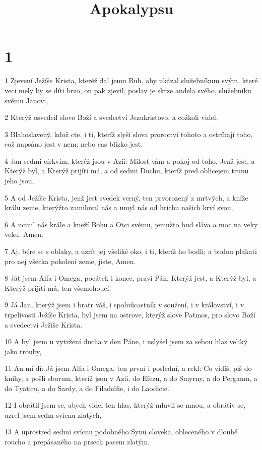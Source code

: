 

\title{Apokalypsu}

\chapter{1}

\par 1 Zjevení Ježíše Krista, kteréž dal jemu Buh, aby ukázal služebníkum svým, které veci mely by se díti brzo, on pak zjevil, poslav je skrze andela svého, služebníku svému Janovi,
\par 2 Kterýž osvedcil slovo Boží a svedectví Jezukristovo, a cožkoli videl.
\par 3 Blahoslavený, kdož cte, i ti, kteríž slyší slova proroctví tohoto a ostríhají toho, což napsáno jest v nem; nebo cas blízko jest.
\par 4 Jan sedmi církvím, kteréž jsou v Azii: Milost vám a pokoj od toho, Jenž jest, a Kterýž byl, a Kterýž prijíti má, a od sedmi Duchu, kteríž pred oblicejem trunu jeho jsou,
\par 5 A od Ježíše Krista, jenž jest svedek verný, ten prvorozený z mrtvých, a kníže králu zeme, kterýžto zamiloval nás a umyl nás od hríchu našich krví svou,
\par 6 A ucinil nás krále a kneží Bohu a Otci svému, jemužto bud sláva a moc na veky veku. Amen.
\par 7 Aj, bére se s oblaky, a uzrít jej všeliké oko, i ti, kteríž ho bodli; a budou plakati pro nej všecka pokolení zeme, jiste, Amen.
\par 8 Ját jsem Alfa i Omega, pocátek i konec, praví Pán, Kterýž jest, a Kterýž byl, a Kterýž prijíti má, ten všemohoucí.
\par 9 Já Jan, kterýž jsem i bratr váš, i spoluúcastník v soužení, i v království, i v trpelivosti Ježíše Krista, byl jsem na ostrove, kterýž slove Patmos, pro slovo Boží a svedectví Ježíše Krista.
\par 10 A byl jsem u vytržení ducha v den Páne, i uslyšel jsem za sebou hlas veliký jako trouby,
\par 11 An mi dí: Já jsem Alfa i Omega, ten první i poslední, a rekl: Co vidíš, piš do knihy, a pošli sborum, kteríž jsou v Azii, do Efezu, a do Smyrny, a do Pergamu, a do Tyatiru, a do Sardy, a do Filadelfie, i do Laodicie.
\par 12 I obrátil jsem se, abych videl ten hlas, kterýž mluvil se mnou, a obrátiv se, uzrel jsem sedm svícnu zlatých,
\par 13 A uprostred sedmi svícnu podobného Synu cloveka, obleceného v dlouhé roucho a prepásaného na prsech pasem zlatým.
